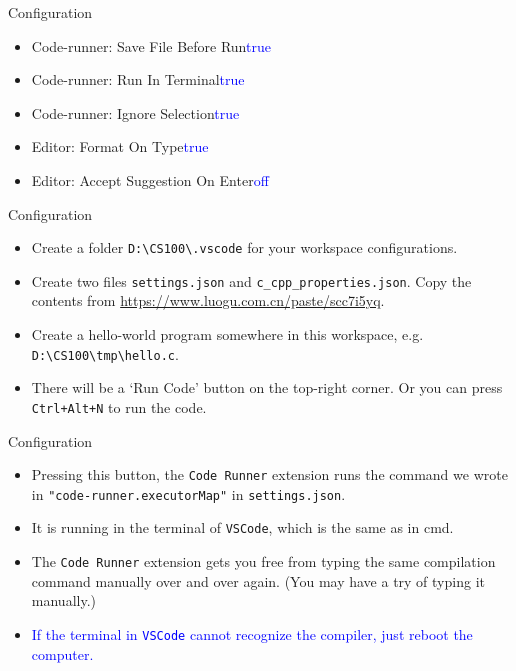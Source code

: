 \documentclass[handout]{beamer}
\newcommand{\blue}[1]{\textcolor{blue}{#1}}
\begin{document}
\begin{frame}{Configuration}
    \begin{itemize}
        \item Code-runner: Save File Before Run\quad\blue{true}
        \item Code-runner: Run In Terminal\quad\blue{true}
        \item Code-runner: Ignore Selection\quad\blue{true}
        \item Editor: Format On Type\quad\blue{true}
        \item Editor: Accept Suggestion On Enter\quad\blue{off}
    \end{itemize}
\end{frame}

\begin{frame}{Configuration}
    \begin{itemize}
        \item Create a folder \texttt{D:\textbackslash CS100\textbackslash .vscode} for your workspace configurations.
        \item Create two files \texttt{settings.json} and \texttt{c\_cpp\_properties.json}. Copy the contents from \url{https://www.luogu.com.cn/paste/scc7i5yq}.
        \pause
        \item Create a hello-world program somewhere in this workspace, e.g. \texttt{D:\textbackslash CS100\textbackslash tmp\textbackslash hello.c}.
        \item There will be a `Run Code' button on the top-right corner. Or you can press \texttt{Ctrl+Alt+N} to run the code.
    \end{itemize}
\end{frame}

\begin{frame}{Configuration}
    \begin{itemize}
        \item Pressing this button, the \texttt{Code Runner} extension runs the command we wrote in \texttt{"code-runner.executorMap"} in \texttt{settings.json}.
        \item It is running in the terminal of \texttt{VSCode}, which is the same as in cmd.
        \item The \texttt{Code Runner} extension gets you free from typing the same compilation command manually over and over again. (You may have a try of typing it manually.)
        \item \blue{If the terminal in \texttt{VSCode} cannot recognize the compiler, just reboot the computer.}
    \end{itemize}
\end{frame}
\end{document}
